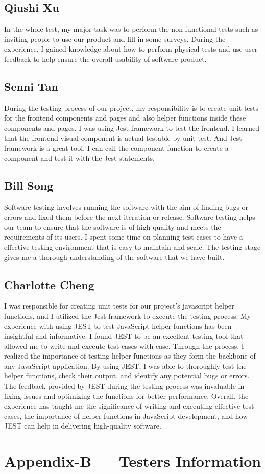 \documentclass[12pt, oneside, openany, titlepage]{article}
\begin{document}
\subsection{Qiushi Xu}
In the whole test, my major task was to perform the non-functional tests such as inviting people to use our product and fill in some surveys. During the experience, I gained knowledge about how to perform physical tests and use user feedback to help ensure the overall usability of software product.

\subsection{Senni Tan}
During the testing process of our project, my responsibility is to create unit tests for the frontend components and pages and also helper functions inside these components and pages. I was using Jest framework to test the frontend. I learned that the frontend visual component is actual testable by unit test. And Jest framework is a great tool, I can call the component function to create a component and test it with the Jest statements. 

\subsection{Bill Song}
Software testing involves running the software with the aim of finding bugs or errors and fixed them before the next iteration or release. Software testing helps our team to ensure that the software is of high quality and meets the requirements of its users. I spent some time on planning test cases to have a effective testing environment that is easy to maintain and scale. The testing stage gives me a thorough understanding of the software that we have built.

\subsection{Charlotte Cheng}
I was responsible for creating unit tests for our project's javascript helper functions, and I utilized the Jest framework to execute the testing process. My experience with using JEST to test JavaScript helper functions has been insightful and informative. I found JEST to be an excellent testing tool that allowed me to write and execute test cases with ease. Through the process, I realized the importance of testing helper functions as they form the backbone of any JavaScript application. By using JEST, I was able to thoroughly test the helper functions, check their output, and identify any potential bugs or errors. The feedback provided by JEST during the testing process was invaluable in fixing issues and optimizing the functions for better performance. Overall, the experience has taught me the significance of writing and executing effective test cases, the importance of helper functions in JavaScript development, and how JEST can help in delivering high-quality software.


\newpage{}
\section{Appendix-B --- Testers Information}
\textcolor{red}{}
\end{document}
